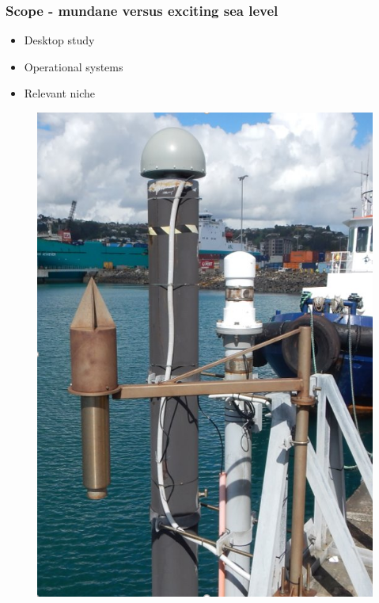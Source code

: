 \begin{frame}
\frametitle{Scope - mundane versus exciting sea level}
\begin{minipage}{0.45\textwidth}
    \begin{itemize}
        \item Desktop study
        \item Operational systems
        \item Relevant niche
    \end{itemize}
\end{minipage}
\hfill
\begin{minipage}{0.45\textwidth}
    \begin{figure}      
    \includegraphics[width=\textwidth]{figures/images/tidegaugeEg.png}
    \end{figure}
\end{minipage}
\end{frame}
